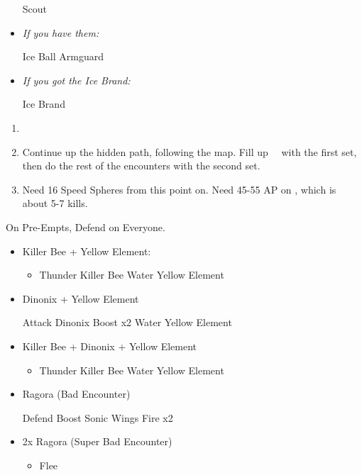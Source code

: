 \begin{equip}
	\begin{itemize}
		\wakkaf Scout
		\item \textit{If you have them:}
		      \begin{itemize}
			      \wakkaf Ice Ball
			      \wakkaf Armguard
		      \end{itemize}
		\item \textit{If you got the Ice Brand:}
		      \begin{itemize}
			      \tidusf Ice Brand
		      \end{itemize}
	\end{itemize}
\end{equip}
\begin{enumerate}[resume]
	\item \formation{\tidus}{\yuna}{\wakka}
	\item Continue up the hidden path, following the map. Fill up \valefor\ \od\ with the first set, then do the rest of the encounters with the second set.
	\item Need 16 Speed Spheres from this point on. Need 45-55 AP on \tidus, which is about 5-7 kills.
\end{enumerate}
\vfill
\begin{encounters}
	On Pre-Empts, Defend on Everyone.
	\begin{itemize}
		\item Killer Bee + Yellow Element:
		      \begin{itemize}
			      \tidusf Defend
			      \summon{\valefor}
			      \valeforf Boost
			      \item Thunder Killer Bee
			            \valeforf Water Yellow Element
		      \end{itemize}
		\item Dinonix + Yellow Element
		      \begin{itemize}
			      \tidusf Attack Dinonix
			      \summon{\valefor}
			      \valeforf Boost x2
			      \valeforf Water Yellow Element
		      \end{itemize}
		\item Killer Bee + Dinonix + Yellow Element
		      \begin{itemize}
			      \tidusf Attack Dinonix
			      \summon{\valefor}
			      \valeforf Boost
			      \item Thunder Killer Bee
			            \valeforf Water Yellow Element
		      \end{itemize}
		\item Ragora (Bad Encounter)
		      \begin{itemize}
			      \tidusf Defend
			      \summon{\valefor}
			      \valeforf Boost
			      \valeforf Sonic Wings
			      \valeforf Fire x2
		      \end{itemize}
		\item 2x Ragora (Super Bad Encounter)
		      \begin{itemize}
			      \tidusf Defend
			      \summon{\valefor}
			      \valeforf Boost
			      \valeforf Dismiss
			      \wakkaf Defend
			      \item Flee
		      \end{itemize}
	\end{itemize}
\end{encounters}
